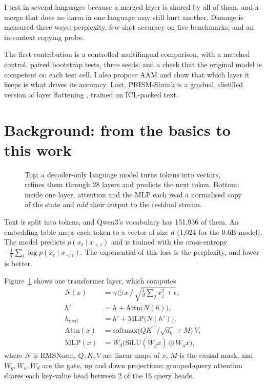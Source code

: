 \documentclass[11pt]{article}
\begin{document}
I test in several languages because a merged layer is shared by all of them, and a merge that does no harm in one
language may still hurt another. Damage is measured three ways: perplexity, few-shot accuracy on five benchmarks, and
an in-context copying probe.

The first contribution is a controlled multilingual comparison, with a matched control, paired bootstrap tests, three
seeds, and a check that the original model is competent on each test cell. I also propose AAM and show that which
layer it keeps is what drives its accuracy. Last, PRISM-Shrink is a gradual, distilled version of layer flattening
\citep{flattengpt}, trained on ICL-packed text.

\section{Background: from the basics to this work}
\label{sec:background}

\begin{figure}[t]
\centering

\caption{Top: a decoder-only language model turns tokens into vectors, refines them through 28 layers and predicts
the next token. Bottom: inside one layer, attention and the MLP each read a normalised copy of the state and
\emph{add} their output to the residual stream.}
\label{fig:transformer}
\end{figure}

Text is split into tokens, and Qwen3's vocabulary has 151{,}936 of them. An embedding table maps each token to a
vector of size $d$ (1{,}024 for the 0.6B model). The model predicts $p(x_t \mid x_{<t})$ and is trained with
the cross-entropy $-\frac{1}{T}\sum_t \log p(x_t \mid x_{<t})$. The exponential of this loss is the perplexity, and
lower is better.

Figure~\ref{fig:transformer} shows one transformer layer, which computes
\begin{align}
N(x) &= \gamma \odot x \,/\, \sqrt{\tfrac{1}{d}\textstyle\sum_j x_j^2 + \epsilon}, \\
h' &= h + \mathrm{Attn}\big(N(h)\big), \\
h_{\mathrm{next}} &= h' + \mathrm{MLP}\big(N(h')\big), \\
\mathrm{Attn}(x) &= \mathrm{softmax}\big(QK^{\top}/\sqrt{d_h} + M\big)\,V, \\
\mathrm{MLP}(x) &= W_{d}\big(\mathrm{SiLU}(W_{g}x) \odot W_{u}x\big),
\end{align}
where $N$ is RMSNorm, $Q, K, V$ are linear maps of $x$, $M$ is the causal mask, and $W_g, W_u, W_d$ are the gate,
up and down projections; grouped-query attention shares each key-value head between 2 of the 16 query heads.
\end{document}
